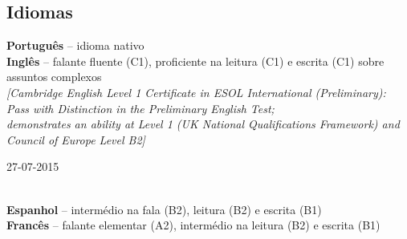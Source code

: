 \documentclass[8pt]{extarticle}
\newcommand{\parag}[1]{
\begin{minipage}{\textwidth} \hfill
\begin{minipage}{\dimexpr\textwidth-0.6cm}
	#1
\end{minipage}
\end{minipage}
}
\newcommand{\itemtime}[2]{
#1 \hfill \begin{minipage}[t]{0.185\textwidth}         #2  \end{minipage}
}
\newcommand{\idiom}[2]{\textbf{#1} – #2\vspace*{6px}\\}
\begin{document}
\subsection*{Idiomas}
\parag{
\idiom{Português}{idioma nativo}
\idiom{Inglês}{falante fluente (C1), proficiente na leitura (C1) e escrita (C1) sobre assuntos complexos\\
\itemtime{
\textit{[Cambridge English Level 1 Certificate in ESOL International (Preliminary):\\
Pass with Distinction in the Preliminary English Test;\\
demonstrates an ability at Level 1 (UK National Qualifications Framework) and Council of Europe Level B2]}
}{27-07-2015}}
\idiom{Espanhol}{intermédio na fala (B2), leitura (B2) e escrita (B1)}
\idiom{Francês}{falante elementar (A2), intermédio na leitura (B2) e escrita (B1)}
}
\end{document}
